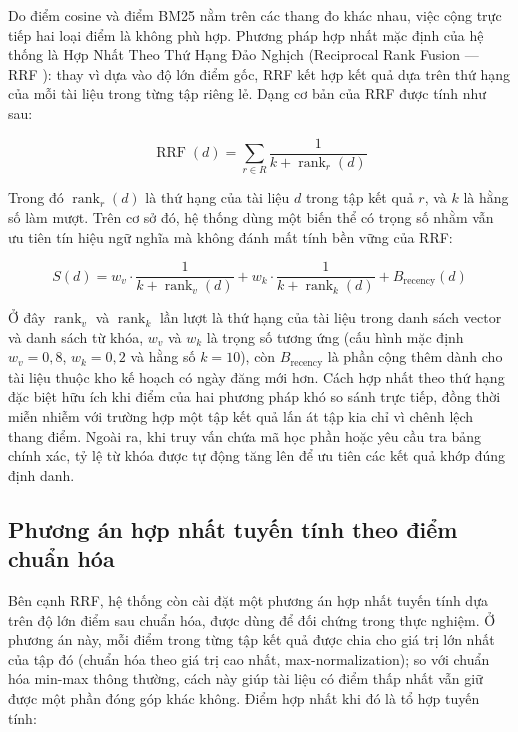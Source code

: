 \documentclass[../DoAn.tex]{subfiles}
\begin{document}
Do điểm cosine và điểm BM25 nằm trên các thang đo khác nhau, việc cộng trực
tiếp hai loại điểm là không phù hợp. Phương pháp hợp nhất mặc định của hệ thống
là Hợp Nhất Theo Thứ Hạng Đảo Nghịch (Reciprocal Rank Fusion --- RRF \cite{rrf2009}): thay vì
dựa vào độ lớn điểm gốc, RRF kết hợp kết quả dựa trên thứ hạng của mỗi tài liệu
trong từng tập riêng lẻ. Dạng cơ bản của RRF được tính như sau:

\begin{equation}
\operatorname{RRF}(d) =
\sum_{r \in R}
\frac{1}{k + \operatorname{rank}_r(d)}
\end{equation}

Trong đó $\operatorname{rank}_r(d)$ là thứ hạng của tài liệu $d$ trong tập kết
quả $r$, và $k$ là hằng số làm mượt. Trên cơ sở đó, hệ thống dùng một biến thể
có trọng số nhằm vẫn ưu tiên tín hiệu ngữ nghĩa mà không đánh mất tính bền vững
của RRF:

\begin{equation}
S(d) =
w_v \cdot \frac{1}{k + \operatorname{rank}_v(d)}
+ w_k \cdot \frac{1}{k + \operatorname{rank}_k(d)}
+ B_{\text{recency}}(d)
\end{equation}

Ở đây $\operatorname{rank}_v$ và $\operatorname{rank}_k$ lần lượt là thứ hạng
của tài liệu trong danh sách vector và danh sách từ khóa, $w_v$ và $w_k$ là
trọng số tương ứng (cấu hình mặc định $w_v = 0{,}8$, $w_k = 0{,}2$ và hằng số
$k = 10$), còn $B_{\text{recency}}$ là phần cộng thêm dành cho tài liệu thuộc
kho kế hoạch có ngày đăng mới hơn. Cách hợp nhất theo thứ hạng đặc biệt hữu ích
khi điểm của hai phương pháp khó so sánh trực tiếp, đồng thời miễn nhiễm với
trường hợp một tập kết quả lấn át tập kia chỉ vì chênh lệch thang điểm. Ngoài
ra, khi truy vấn chứa mã học phần hoặc yêu cầu tra bảng chính xác, tỷ lệ từ khóa
được tự động tăng lên để ưu tiên các kết quả khớp đúng định danh.

\subsection{Phương án hợp nhất tuyến tính theo điểm chuẩn hóa}

Bên cạnh RRF, hệ thống còn cài đặt một phương án hợp nhất tuyến tính dựa trên
độ lớn điểm sau chuẩn hóa, được dùng để đối chứng trong thực nghiệm. Ở phương
án này, mỗi điểm trong từng tập kết quả được chia cho giá trị lớn nhất của tập
đó (chuẩn hóa theo giá trị cao nhất, max-normalization); so với chuẩn hóa
min-max thông thường, cách này giúp tài liệu có điểm thấp nhất vẫn giữ được một
phần đóng góp khác không. Điểm hợp nhất khi đó là tổ hợp tuyến tính:
\end{document}
